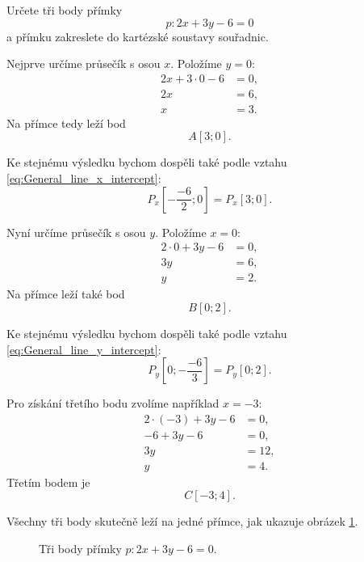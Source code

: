 \begin{example}\label{exa:Finding_points_general_line}
    Určete tři body přímky
    \[
        p: 2x+3y-6=0
    \]
    a přímku zakreslete do kartézské soustavy souřadnic.

    Nejprve určíme průsečík s osou $x$. Položíme $y=0$:
    \begin{align*}
        2x+3\cdot0-6&=0,\\
        2x&=6,\\
        x&=3.
    \end{align*}
    Na přímce tedy leží bod
    \[
        A[3;0].
    \]

    Ke stejnému výsledku bychom dospěli také podle vztahu \eqref{eq:General_line_x_intercept}:
    \[
        P_x\left[-\frac{-6}{2};0\right]
        =
        P_x[3;0].
    \]

    Nyní určíme průsečík s osou $y$. Položíme $x=0$:
    \begin{align*}
        2\cdot0+3y-6&=0,\\
        3y&=6,\\
        y&=2.
    \end{align*}
    Na přímce leží také bod
    \[
        B[0;2].
    \]

    Ke stejnému výsledku bychom dospěli také podle vztahu \eqref{eq:General_line_y_intercept}:
    \[
        P_y\left[0;-\frac{-6}{3}\right]
        =
        P_y[0;2].
    \]

    Pro získání třetího bodu zvolíme například $x=-3$:
    \begin{align*}
        2\cdot(-3)+3y-6&=0,\\
        -6+3y-6&=0,\\
        3y&=12,\\
        y&=4.
    \end{align*}
    Třetím bodem je
    \[
        C[-3;4].
    \]

    Všechny tři body skutečně leží na jedné přímce, jak ukazuje
    obrázek \ref{fig:General_line_from_points}.

    \begin{figure}[H]
        \centering
        \caption{Tři body přímky $p:2x+3y-6=0$.}
        \label{fig:General_line_from_points}
    \end{figure}
\end{example}

